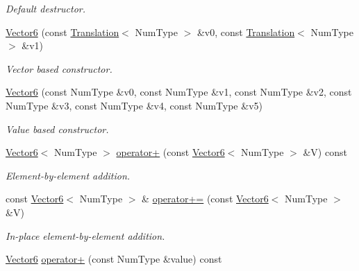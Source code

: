 \begin{DoxyCompactItemize}
\begin{DoxyCompactList}\small\item\em Default destructor. \end{DoxyCompactList}\item 
\hyperlink{singletonscrews_1_1_vector6_a5905caaa7e9402ee2ca0654eaaa6b011}{Vector6} (const \hyperlink{singletonscrews_1_1_translation}{Translation}$<$ Num\+Type $>$ \&v0, const \hyperlink{singletonscrews_1_1_translation}{Translation}$<$ Num\+Type $>$ \&v1)
\begin{DoxyCompactList}\small\item\em Vector based constructor. \end{DoxyCompactList}\item 
\hyperlink{singletonscrews_1_1_vector6_ac79fc8dd6b0560acfa169c7043fe9b82}{Vector6} (const Num\+Type \&v0, const Num\+Type \&v1, const Num\+Type \&v2, const Num\+Type \&v3, const Num\+Type \&v4, const Num\+Type \&v5)
\begin{DoxyCompactList}\small\item\em Value based constructor. \end{DoxyCompactList}\item 
\hypertarget{singletonscrews_1_1_vector6_a7574361744445ec5dbf017ba1052ffb6}{\hyperlink{singletonscrews_1_1_vector6}{Vector6}$<$ Num\+Type $>$ \hyperlink{singletonscrews_1_1_vector6_a7574361744445ec5dbf017ba1052ffb6}{operator+} (const \hyperlink{singletonscrews_1_1_vector6}{Vector6}$<$ Num\+Type $>$ \&V) const }\label{singletonscrews_1_1_vector6_a7574361744445ec5dbf017ba1052ffb6}

\begin{DoxyCompactList}\small\item\em Element-\/by-\/element addition. \end{DoxyCompactList}\item 
\hypertarget{singletonscrews_1_1_vector6_a794cb4a60331f893f7be7388b9f4a7af}{const \hyperlink{singletonscrews_1_1_vector6}{Vector6}$<$ Num\+Type $>$ \& \hyperlink{singletonscrews_1_1_vector6_a794cb4a60331f893f7be7388b9f4a7af}{operator+=} (const \hyperlink{singletonscrews_1_1_vector6}{Vector6}$<$ Num\+Type $>$ \&V)}\label{singletonscrews_1_1_vector6_a794cb4a60331f893f7be7388b9f4a7af}

\begin{DoxyCompactList}\small\item\em In-\/place element-\/by-\/element addition. \end{DoxyCompactList}\item 
\hypertarget{singletonscrews_1_1_vector6_a44c50d24ca07b75e942416f0478747f0}{\hyperlink{singletonscrews_1_1_vector6}{Vector6} \hyperlink{singletonscrews_1_1_vector6_a44c50d24ca07b75e942416f0478747f0}{operator+} (const Num\+Type \&value) const }\label{singletonscrews_1_1_vector6_a44c50d24ca07b75e942416f0478747f0}


\end{DoxyCompactItemize}
